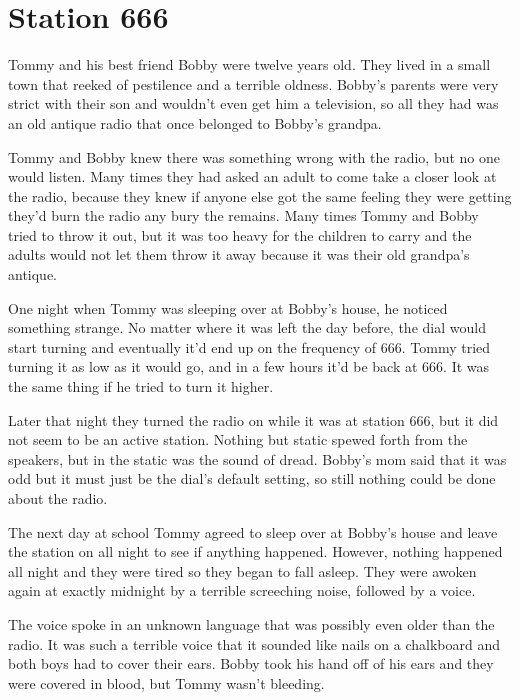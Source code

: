 \chapter{Station 666}


Tommy and his best friend Bobby were twelve years old. They lived
in a small town that reeked of pestilence and a terrible oldness.
Bobby's parents were very strict with their son and
wouldn't even get him a television, so all they had was an
old antique radio that once belonged to Bobby's
grandpa.



Tommy and Bobby knew there was something wrong with the radio, but
no one would listen. Many times they had asked an adult to come
take a closer look at the radio, because they knew if anyone else
got the same feeling they were getting they'd burn the radio
any bury the remains. Many times Tommy and Bobby tried to throw it
out, but it was too heavy for the children to carry and the adults
would not let them throw it away because it was their old
grandpa's antique.



One night when Tommy was sleeping over at Bobby's house, he
noticed something strange. No matter where it was left the day
before, the dial would start turning and eventually it'd end
up on the frequency of 666. Tommy tried turning it as low as it
would go, and in a few hours it'd be back at 666. It was the
same thing if he tried to turn it higher.



Later that night they turned the radio on while it was at station
666, but it did not seem to be an active station. Nothing but
static spewed forth from the speakers, but in the static was the
sound of dread. Bobby's mom said that it was odd but it must
just be the dial's default setting, so still nothing could be
done about the radio.



The next day at school Tommy agreed to sleep over at Bobby's
house and leave the station on all night to see if anything
happened. However, nothing happened all night and they were tired
so they began to fall asleep. They were awoken again at exactly
midnight by a terrible screeching noise, followed by a voice.



The voice spoke in an unknown language that was possibly even older
than the radio. It was such a terrible voice that it sounded like
nails on a chalkboard and both boys had to cover their ears. Bobby
took his hand off of his ears and they were covered in blood, but
Tommy wasn't bleeding.




